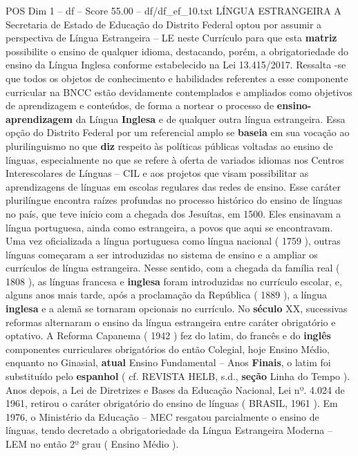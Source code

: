 \begin{textsample}{POS Dim 1 – df – Score 55.00 – df/df\_ef\_10.txt}  \label{ex:f1_pos_123}
LÍNGUA ESTRANGEIRA A Secretaria de Estado de Educação do Distrito Federal optou por assumir a perspectiva de Língua Estrangeira – LE neste Currículo para que esta \textbf{matriz} possibilite o ensino de qualquer idioma, destacando, porém, a obrigatoriedade do ensino da Língua Inglesa conforme estabelecido na Lei 13.415/2017.
Ressalta -se que todos os objetos de conhecimento e habilidades referentes a esse componente curricular na BNCC estão devidamente contemplados e ampliados como objetivos de aprendizagem e conteúdos, de forma a nortear o processo de \textbf{ensino-aprendizagem} da Língua \textbf{Inglesa} e de qualquer outra língua estrangeira.
Essa opção do Distrito Federal por um referencial amplo se \textbf{baseia} em sua vocação ao plurilinguismo no que \textbf{diz} respeito às políticas públicas voltadas ao ensino de línguas, especialmente no que se refere à oferta de variados idiomas nos Centros Interescolares de Línguas – CIL e aos projetos que visam possibilitar as aprendizagens de línguas em escolas regulares das redes de ensino.
Esse caráter plurilíngue encontra raízes profundas no processo histórico do ensino de línguas no país, que teve início com a chegada dos Jesuítas, em 1500.
Eles ensinavam a língua portuguesa, ainda como estrangeira, a povos que aqui se encontravam.
Uma vez oficializada a língua portuguesa como língua nacional ( 1759 ), outras línguas começaram a ser introduzidas no sistema de ensino e a ampliar os currículos de língua estrangeira.
Nesse sentido, com a chegada da família real ( 1808 ), as línguas francesa e \textbf{inglesa} foram introduzidas no currículo escolar, e, alguns anos mais tarde, após a proclamação da República ( 1889 ), a língua \textbf{inglesa} e a alemã se tornaram opcionais no currículo.
No \textbf{século} XX, sucessivas reformas alternaram o ensino da língua estrangeira entre caráter obrigatório e optativo.
A Reforma Capanema ( 1942 ) fez do latim, do francês e do \textbf{inglês} componentes curriculares obrigatórios do então Colegial, hoje Ensino Médio, enquanto no Ginasial, \textbf{atual} Ensino Fundamental – Anos \textbf{Finais}, o latim foi substituído pelo \textbf{espanhol} ( cf.
REVISTA HELB, s.d., \textbf{seção} Linha do Tempo ).
Anos depois, a Lei de Diretrizes e Bases da Educação Nacional, Lei nº. 4.024 de 1961, retirou o caráter obrigatório do ensino de línguas ( BRASIL, 1961 ).
Em 1976, o Ministério da Educação – MEC resgatou parcialmente o ensino de línguas, tendo decretado a obrigatoriedade da Língua Estrangeira Moderna – LEM no então 2º grau ( Ensino Médio ).

\end{textsample}
